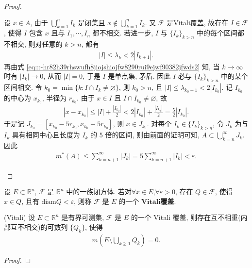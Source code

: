 \documentclass[../../main.tex]{subfiles}%
\begin{document}
\begin{proof}
\begin{enumerate}[(1)]
设 $x\in A$, 由于 $\bigcup_{k=1}^n I_k$ 是闭集且 $x\notin\bigcup_{k=1}^n I_k$. 又 $\mathcal{F}$ 是Vitali覆盖, 故存在 $I\in\mathcal{F}$, 使得 $I$ 包含 $x$ 且与 $I_1,\cdots,I_n$ 都不相交. 若进一步, $I$ 与 $\{I_k\}_{k>n}$ 中的每个区间都不相交, 则对任意的 $k>n$, 都有
\begin{align*}
|I|\leqslant\lambda_k<2|I_{k+1}|.
\end{align*}
再由式 \eqref{eq:::-hr82h39rhswufh8jiojshiojfw8290rui9ejwf90382jfwds2} 知, 当 $k\to\infty$ 时有 $|I_k|\to 0$, 从而 $|I|=0$, 于是 $I$ 是单点集, 矛盾. 因此 $I$ 必与 $\{I_k\}_{k>n}$ 中的某个区间相交. 令 $k_0=\min\{k:I\cap I_k\neq\varnothing \}$, 则 $k_0>n$, 且 $|I|\leqslant\lambda_{k_0-1}<2|I_{k_0}|$. 记 $I_{k_0}$ 的中心为 $x_{k_0}$, 半径为 $r_{k_0}$. 由于 $x\in I$ 且 $I\cap I_{k_0}\neq\varnothing $, 故
\begin{align*}
|x-x_{k_0}|\leqslant|I|+\frac{|I_{k_0}|}{2}<2|I_{k_0}|+\frac{|I_{k_0}|}{2}=\frac{5}{2}|I_{k_0}|.
\end{align*}
于是记 $J_{k_0}=[x_{k_0}-5r_{k_0},x_{k_0}+5r_{k_0}]$, 则 $x\in J_{k_0}$. 对每个 $I_k\in\{I_k\}_{k>n}$, 令 $J_k$ 为与 $I_k$ 具有相同中心且长度为 $I_k$ 的 $5$ 倍的区间, 则由前面的证明可知, $A\subset\bigcup_{k=n}^\infty J_k$. 因此
\begin{align*}
m^*(A)\leqslant\sum_{k=n+1}^\infty|J_k|=5\sum_{k=n+1}^\infty|I_k|<\varepsilon.
\end{align*}

\end{enumerate}
\end{proof}

\begin{definition}
设 $E\subset\mathbb{R}^n$, $\mathcal{F}$ 是 $\mathbb{R}^n$ 中的一族闭方体. 若对$\forall x\in E$,$\forall \varepsilon>0$, 存在 $Q\in\mathcal{F}$, 使得 $x\in Q$, 且有 $\mathrm{diam}Q<\varepsilon$, 则称 $\mathcal{F}$ 是 $E$ 的一个 $\mathbf{Vitali}$\textbf{覆盖}.
\end{definition}

\begin{proposition}
(Vitali) 设 $E\subset\mathbb{R}^n$ 是有界可测集, $\mathcal{F}$ 是 $E$ 的一个 Vitali 覆盖, 则存在互不相重(内部互不相交)的可数列 $\{Q_k\}$, 使得
\begin{align*}
m\!\left(E\setminus\bigcup_{k\geqslant 1} Q_k\right)=0.
\end{align*}
\end{proposition}
\begin{proof}

\end{proof}
\end{document}
